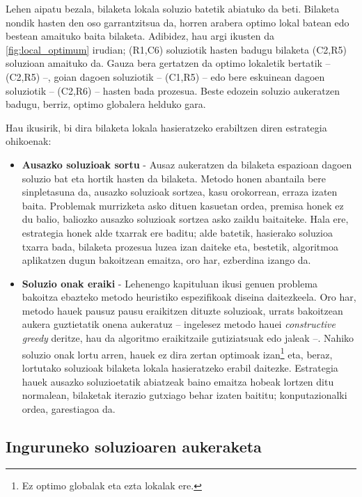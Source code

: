 \documentclass[eu]{ifirak}\usepackage[]{graphicx}\usepackage[]{color}
\begin{document}
Lehen aipatu bezala, bilaketa lokala soluzio batetik abiatuko da beti. Bilaketa nondik hasten den oso garrantzitsua da, horren arabera optimo lokal batean edo bestean amaituko baita bilaketa. Adibidez, hau argi ikusten da \ref{fig:local_optimum} irudian; (R1,C6) soluziotik hasten badugu bilaketa (C2,R5) soluzioan amaituko da. Gauza bera gertatzen da optimo lokaletik bertatik -- (C2,R5) --, goian dagoen soluziotik -- (C1,R5) -- edo bere eskuinean dagoen soluziotik -- (C2,R6) -- hasten bada prozesua. Beste edozein soluzio aukeratzen badugu, berriz, optimo globalera helduko gara. 

Hau ikusirik, bi dira bilaketa lokala hasieratzeko erabiltzen diren estrategia ohikoenak:

\begin{itemize}
\item \textbf{Ausazko soluzioak sortu} -  Ausaz aukeratzen da bilaketa espazioan dagoen soluzio bat eta hortik hasten da bilaketa. Metodo honen abantaila bere sinpletasuna da, ausazko soluzioak sortzea, kasu orokorrean, erraza izaten baita. Problemak murrizketa asko dituen kasuetan ordea, premisa honek ez du balio, baliozko ausazko soluzioak sortzea asko zaildu baitaiteke. Hala ere, estrategia honek alde txarrak ere baditu; alde batetik, hasierako soluzioa txarra bada, bilaketa prozesua luzea izan daiteke eta, bestetik, algoritmoa aplikatzen dugun bakoitzean emaitza, oro har, ezberdina izango da. 
\item \textbf{Soluzio onak eraiki} - Lehenengo kapituluan ikusi genuen problema bakoitza ebazteko metodo heuristiko espezifikoak diseina daitezkeela. Oro har, metodo hauek pausuz pausu eraikitzen dituzte soluzioak, urrats bakoitzean aukera guztietatik onena aukeratuz -- ingelesez metodo hauei \textit{constructive greedy} deritze, hau da algoritmo eraikitzaile gutiziatsuak edo jaleak --. Nahiko soluzio onak lortu arren, hauek ez dira zertan optimoak izan\footnote{Ez optimo globalak eta ezta lokalak ere.} eta, beraz, lortutako soluzioak bilaketa lokala hasieratzeko erabil daitezke. Estrategia hauek ausazko soluzioetatik abiatzeak baino emaitza hobeak lortzen ditu normalean, bilaketak iterazio gutxiago behar izaten baititu; konputazionalki ordea, garestiagoa da.
\end{itemize}

\subsection{Inguruneko soluzioaren aukeraketa}\label{sec:LS_selection}
\end{document}
